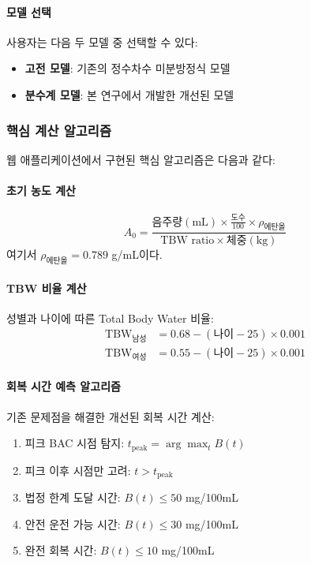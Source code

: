 \documentclass[11pt]{article}
\begin{document}
\paragraph{모델 선택}
사용자는 다음 두 모델 중 선택할 수 있다:
\begin{itemize}
    \item \textbf{고전 모델}: 기존의 정수차수 미분방정식 모델
    \item \textbf{분수계 모델}: 본 연구에서 개발한 개선된 모델
\end{itemize}

\subsubsection{핵심 계산 알고리즘}

웹 애플리케이션에서 구현된 핵심 알고리즘은 다음과 같다:

\paragraph{초기 농도 계산}
\begin{equation}
A_0 = \frac{\text{음주량}(\text{mL}) \times \frac{\text{도수}}{100} \times \rho_{\text{에탄올}}}{\text{TBW ratio} \times \text{체중}(\text{kg})}
\end{equation}
여기서 $\rho_{\text{에탄올}} = 0.789$ g/mL이다.

\paragraph{TBW 비율 계산}
성별과 나이에 따른 Total Body Water 비율:
\begin{align}
\text{TBW}_{\text{남성}} &= 0.68 - (\text{나이} - 25) \times 0.001 \\
\text{TBW}_{\text{여성}} &= 0.55 - (\text{나이} - 25) \times 0.001
\end{align}

\paragraph{회복 시간 예측 알고리즘}
기존 문제점을 해결한 개선된 회복 시간 계산:
\begin{enumerate}
    \item 피크 BAC 시점 탐지: $t_{\text{peak}} = \arg\max_t B(t)$
    \item 피크 이후 시점만 고려: $t > t_{\text{peak}}$
    \item 법정 한계 도달 시간: $B(t) \leq 50$ mg/100mL
    \item 안전 운전 가능 시간: $B(t) \leq 30$ mg/100mL  
    \item 완전 회복 시간: $B(t) \leq 10$ mg/100mL
\end{enumerate}
\end{document}

